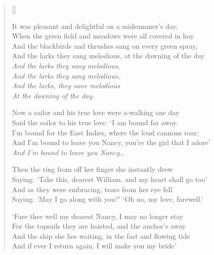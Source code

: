 \pagebreak
\settowidth{\versewidth}{Saying: `Take this, dearest William, and my heart shall go too}
\begin{verse}[\versewidth]
\begin{patverse}
It was pleasant and delightful on a midsummer's day,\\
When the green field and meadows were all covered in hay\\
And the blackbirds and thrushes sang on every green spray,\\
And the larks they sang melodious, at the dawning of the day\\
\textit{And the larks they sang melodious,\\
And the larks they sang melodious,\\
And the larks, they sane melodious\\
At the dawning of the day.}
\end{patverse}

\begin{patverse}
Now a sailor and his true love were a-walking one day\\
Said the sailor to his true love: `I am bound far away.\\
I'm bound for the East Indies, where the loud cannons roar;\\
And I'm bound to leave you Nancy, you're the girl that I adore'\\
\textit{And I'm bound to leave you Nancy\dots{}}
\end{patverse}


Then the ring from off her finger she instantly drew\\
Saying: `Take this, dearest William, and my heart shall go too'\\
And as they were embracing, tears from her eye fell\\
Saying: `May I go along with you?' `Oh no, my love, farewell.'

`Fare thee well my dearest Nancy, I may no longer stay\\
For the topsails they are hoisted, and the anchor's away\\
And the ship she lies waiting, in the fast and flowing tide\\
And if ever I return again, I will make you my bride'
\end{verse}
